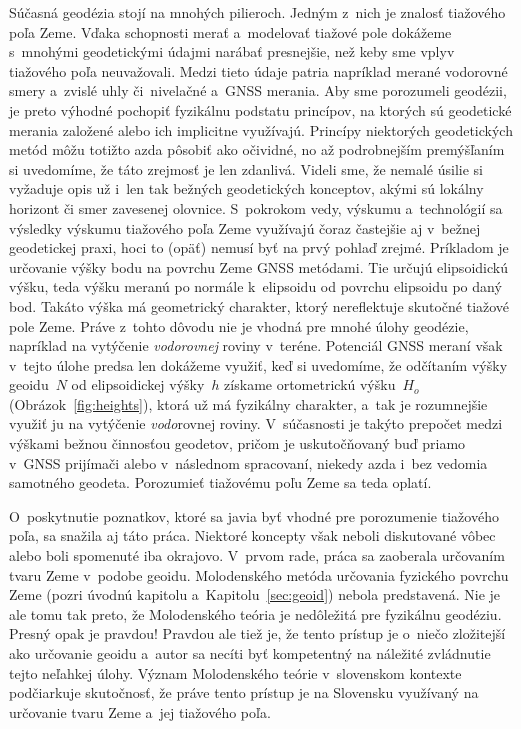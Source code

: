 \documentclass[a4paper, 12pt]{book}
\begin{document}
Súčasná geodézia stojí na mnohých pilieroch.  Jedným z~nich je znalosť 
tiažového poľa Zeme.  Vďaka schopnosti merať a~modelovať tiažové pole dokážeme 
s~mnohými geodetickými údajmi narábať presnejšie, než keby sme vplyv tiažového 
poľa neuvažovali.  Medzi tieto údaje patria napríklad merané vodorovné smery 
a~zvislé uhly či~nivelačné a~GNSS merania.  Aby sme porozumeli geodézii, je 
preto výhodné pochopiť fyzikálnu podstatu princípov, na ktorých sú geodetické 
merania založené alebo ich implicitne využívajú.  Princípy niektorých 
geodetických metód môžu totižto azda pôsobiť ako očividné, no až podrobnejším 
premýšľaním si uvedomíme, že táto zrejmosť je len zdanlivá.  Videli sme, že 
nemalé úsilie si vyžaduje opis už i~len tak bežných geodetických konceptov, 
akými sú lokálny horizont či smer zavesenej olovnice.  S~pokrokom vedy, výskumu 
a~technológií sa výsledky výskumu tiažového poľa Zeme využívajú čoraz častejšie 
aj v~bežnej geodetickej praxi, hoci to (opäť) nemusí byť na prvý pohlaď zrejmé.  
Príkladom je určovanie výšky bodu na povrchu Zeme GNSS metódami.  Tie určujú 
elipsoidickú výšku, teda výšku meranú po normále k~elipsoidu od povrchu 
elipsoidu po daný bod.  Takáto výška má geometrický charakter, ktorý 
nereflektuje skutočné tiažové pole Zeme.  Práve z~tohto dôvodu nie je vhodná 
pre mnohé úlohy geodézie, napríklad na vytýčenie \emph{vodorovnej} roviny 
v~teréne.  Potenciál GNSS meraní však v~tejto úlohe predsa len dokážeme využiť, 
keď si uvedomíme, že odčítaním výšky geoidu~$N$ od elipsoidickej výšky~$h$ 
získame ortometrickú výšku~$H_o$ (Obrázok~\ref{fig:heights}), ktorá už má 
fyzikálny charakter, a~tak je rozumnejšie využiť ju na vytýčenie 
\emph{vodo}rovnej roviny.  V~súčasnosti je takýto prepočet medzi výškami bežnou 
činnosťou geodetov, pričom je uskutočňovaný buď priamo v~GNSS prijímači alebo 
v~následnom spracovaní, niekedy azda i~bez vedomia samotného geodeta.  
Porozumieť tiažovému poľu Zeme sa teda oplatí.

O~poskytnutie poznatkov, ktoré sa javia byť vhodné pre porozumenie tiažového 
poľa, sa snažila aj táto práca.  Niektoré koncepty však neboli diskutované 
vôbec alebo boli spomenuté iba okrajovo.  V~prvom rade, práca sa zaoberala 
určovaním tvaru Zeme v~podobe geoidu.  Molodenského metóda určovania fyzického 
povrchu Zeme (pozri úvodnú kapitolu a~Kapitolu~\ref{sec:geoid}) nebola 
predstavená.  Nie je ale tomu tak preto, že Molodenského teória je nedôležitá 
pre fyzikálnu geodéziu.  Presný opak je pravdou!  Pravdou ale tiež je, že tento 
prístup je o~niečo zložitejší ako určovanie geoidu a~autor sa necíti byť 
kompetentný na náležité zvládnutie tejto neľahkej úlohy.  Význam Molodenského 
teórie v~slovenskom kontexte podčiarkuje skutočnosť, že práve tento prístup je 
na Slovensku využívaný na určovanie tvaru Zeme a~jej tiažového poľa.
\end{document}
